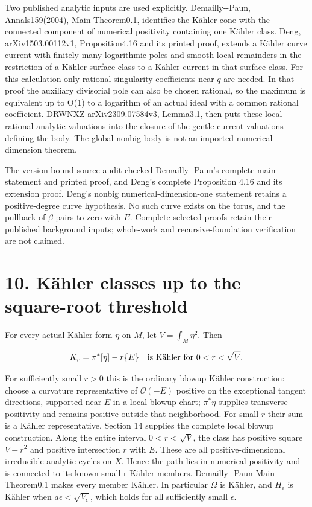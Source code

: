 \documentclass[11pt]{article}
\begin{document}
Two published analytic inputs are used explicitly. Demailly-\allowbreak{}-\allowbreak{}Paun, Annals159(2004), Main Theorem0.1, identifies the Kähler cone with the connected component of numerical positivity containing one Kähler class. Deng, arXiv1503.00112v1, Proposition4.16 and its printed proof, extends a Kähler curve current with finitely many logarithmic poles and smooth local remainders in the restriction of a Kähler surface class to a Kähler current in that surface class. For this calculation only rational singularity coefficients near $q$ are needed. In that proof the auxiliary divisorial pole can also be chosen rational, so the maximum is equivalent up to O(1) to a logarithm of an actual ideal with a common rational coefficient. DRWNXZ arXiv2309.07584v3, Lemma3.1, then puts these local rational analytic valuations into the closure of the gentle-\allowbreak{}current valuations defining the body. The global nonbig body is not an imported numerical-\allowbreak{}dimension theorem.

The version-\allowbreak{}bound source audit checked Demailly-\allowbreak{}-\allowbreak{}Paun's complete main statement and printed proof, and Deng's complete Proposition 4.16 and its extension proof. Deng's nonbig numerical-\allowbreak{}dimension-\allowbreak{}one statement retains a positive-\allowbreak{}degree curve hypothesis. No such curve exists on the torus, and the pullback of $\beta$ pairs to zero with $E$. Complete selected proofs retain their published background inputs; whole-\allowbreak{}work and recursive-\allowbreak{}foundation verification are not claimed.

\section*{10. Kähler classes up to the square-\allowbreak{}root threshold}

For every actual Kähler form $\eta$ on $M$, let $V=\int_M\eta^2$. Then

\[K_r=\pi^*[\eta]-r\{E\}\quad\hbox{is Kähler for }0<r<\sqrt V.\]

For sufficiently small $r>0$ this is the ordinary blowup Kähler construction: choose a curvature representative of $\mathcal O(-E)$ positive on the exceptional tangent directions, supported near $E$ in a local blowup chart; $\pi^*\eta$ supplies transverse positivity and remains positive outside that neighborhood. For small $r$ their sum is a Kähler representative. Section 14 supplies the complete local blowup construction. Along the entire interval $0<r<\sqrt V$, the class has positive square $V-r^2$ and positive intersection $r$ with $E$. These are all positive-\allowbreak{}dimensional irreducible analytic cycles on $X$. Hence the path lies in numerical positivity and is connected to its known small-\allowbreak{}r Kähler members. Demailly-\allowbreak{}-\allowbreak{}Paun Main Theorem0.1 makes every member Kähler. In particular $\Omega$ is Kähler, and $H_\epsilon$ is Kähler when $a\epsilon<\sqrt{V_\epsilon}$, which holds for all sufficiently small $\epsilon$.
\end{document}
